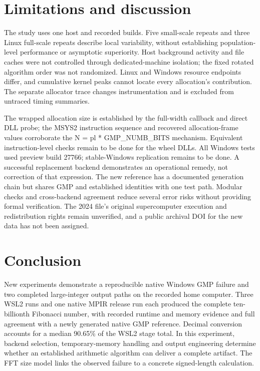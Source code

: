 \documentclass[11pt,a4paper]{article}
\begin{document}
\section{Limitations and discussion}

The study uses one host and recorded builds. Five small-scale repeats and three Linux full-scale repeats describe local variability, without establishing population-level performance or asymptotic superiority. Host background activity and file caches were not controlled through dedicated-machine isolation; the fixed rotated algorithm order was not randomized. Linux and Windows resource endpoints differ, and cumulative kernel peaks cannot locate every allocation's contribution. The separate allocator trace changes instrumentation and is excluded from untraced timing summaries.

The wrapped allocation size is established by the full-width callback and direct DLL probe; the MSYS2 instruction sequence and recovered allocation-frame values corroborate the N = pl * GMP\_\allowbreak{}NUMB\_\allowbreak{}BITS mechanism. Equivalent instruction-level checks remain to be done for the wheel DLLs. All Windows tests used preview build 27766; stable-Windows replication remains to be done. A successful replacement backend demonstrates an operational remedy, not correction of that expression. The new reference has a documented generation chain but shares GMP and established identities with one test path. Modular checks and cross-backend agreement reduce several error risks without providing formal verification. The 2024 file's original supercomputer execution and redistribution rights remain unverified, and a public archival DOI for the new data has not been assigned.

\section{Conclusion}

New experiments demonstrate a reproducible native Windows GMP failure and two completed large-integer output paths on the recorded home computer. Three WSL2 runs and one native MPIR release run each produced the complete ten-billionth Fibonacci number, with recorded runtime and memory evidence and full agreement with a newly generated native GMP reference. Decimal conversion accounts for a median 90.65\% of the WSL2 stage total. In this experiment, backend selection, temporary-memory handling and output engineering determine whether an established arithmetic algorithm can deliver a complete artifact. The FFT size model links the observed failure to a concrete signed-length calculation.
\end{document}
